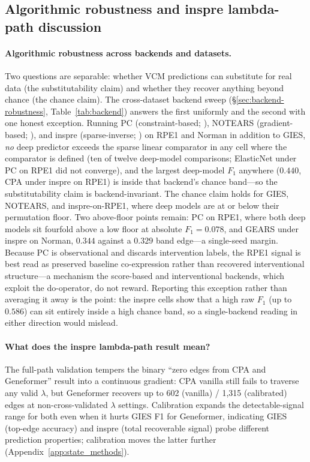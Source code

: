 \documentclass{article}
\theoremstyle{plain}
\theoremstyle{definition}
\theoremstyle{remark}
\begin{document}
\subsection{Algorithmic robustness and inspre lambda-path discussion}
\label{app:extended-discussion}
\paragraph{Algorithmic robustness across backends and datasets.}
Two questions are separable: whether VCM predictions can substitute for real data (the substitutability claim) and whether they recover anything beyond chance (the chance claim). The cross-dataset backend sweep (\S\ref{sec:backend-robustness}, Table~\ref{tab:backend}) answers the first uniformly and the second with one honest exception. Running PC (constraint-based; \citealt{spirtes2000}), NOTEARS (gradient-based; \citealt{zheng2018notears}), and inspre (sparse-inverse; \citealt{brown2025inspre}) on RPE1 and Norman in addition to GIES, \emph{no} deep predictor exceeds the sparse linear comparator in any cell where the comparator is defined (ten of twelve deep-model comparisons; ElasticNet under PC on RPE1 did not converge), and the largest deep-model $F_1$ anywhere ($0.440$, CPA under inspre on RPE1) is inside that backend's chance band---so the substitutability claim is backend-invariant. The chance claim holds for GIES, NOTEARS, and inspre-on-RPE1, where deep models are at or below their permutation floor. Two above-floor points remain: PC on RPE1, where both deep models sit fourfold above a low floor at absolute $F_1 = 0.078$, and GEARS under inspre on Norman, $0.344$ against a $0.329$ band edge---a single-seed margin. Because PC is observational and discards intervention labels, the RPE1 signal is best read as preserved baseline co-expression rather than recovered interventional structure---a mechanism the score-based and interventional backends, which exploit the do-operator, do not reward. Reporting this exception rather than averaging it away is the point: the inspre cells show that a high raw $F_1$ (up to $0.586$) can sit entirely inside a high chance band, so a single-backend reading in either direction would mislead.

\paragraph{What does the inspre lambda-path result mean?}
The full-path validation tempers the binary ``zero edges from CPA and Geneformer'' result into a continuous gradient: CPA vanilla still fails to traverse any valid $\lambda$, but Geneformer recovers up to 602 (vanilla) / 1{,}315 (calibrated) edges at non-cross-validated $\lambda$ settings. Calibration expands the detectable-signal range for both even when it hurts GIES F1 for Geneformer, indicating GIES (top-edge accuracy) and inspre (total recoverable signal) probe different prediction properties; calibration moves the latter further (Appendix~\ref{app:state_methods}).
\end{document}
